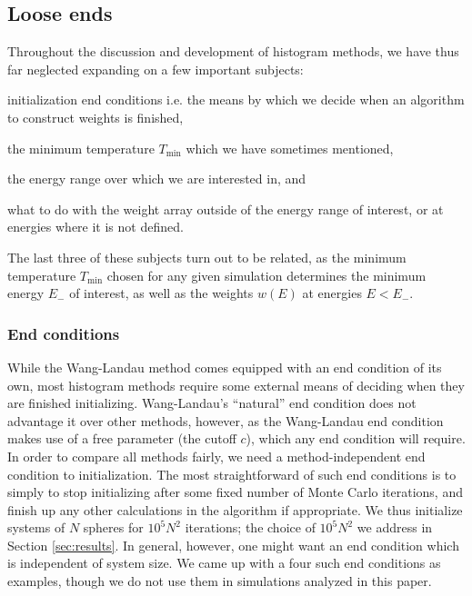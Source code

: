 \documentclass[11pt]{article}
\renewcommand{\t}{\text} %
\newcommand{\p}[1]{\left(#1\right)} %
\begin{document}
\subsection{Loose ends}
\label{sec:loose_ends}

Throughout the discussion and development of histogram methods, we
have thus far neglected expanding on a few important subjects:
\begin{enumerate*}[label=\roman*)]
\item initialization end conditions i.e. the means by which we decide
  when an algorithm to construct weights is finished,
\item the minimum temperature $T_{\t{min}}$ which we have sometimes
  mentioned,
\item the energy range over which we are interested in, and
\item what to do with the weight array outside of the energy range of
  interest, or at energies where it is not defined.
\end{enumerate*}
The last three of these subjects turn out to be related, as the
minimum temperature $T_{\t{min}}$ chosen for any given simulation
determines the minimum energy $E_-$ of interest, as well as the
weights $w\p{E}$ at energies $E<E_-$.

\subsubsection{End conditions}
\label{sec:end_conditions}

While the Wang-Landau method comes equipped with an end condition of
its own, most histogram methods require some external means of
deciding when they are finished initializing. Wang-Landau's
``natural'' end condition does not advantage it over other methods,
however, as the Wang-Landau end condition makes use of a free
parameter (the cutoff $c$), which any end condition will require. In
order to compare all methods fairly, we need a method-independent end
condition to initialization. The most straightforward of such end
conditions is to simply to stop initializing after some fixed number
of Monte Carlo iterations, and finish up any other calculations in the
algorithm if appropriate. We thus initialize systems of $N$ spheres
for $10^5N^2$ iterations; the choice of $10^5N^2$ we address in
Section \ref{sec:results}. In general, however, one might want an end
condition which is independent of system size. We came up with a four
such end conditions as examples, though we do not use them in
simulations analyzed in this paper.
\end{document}
